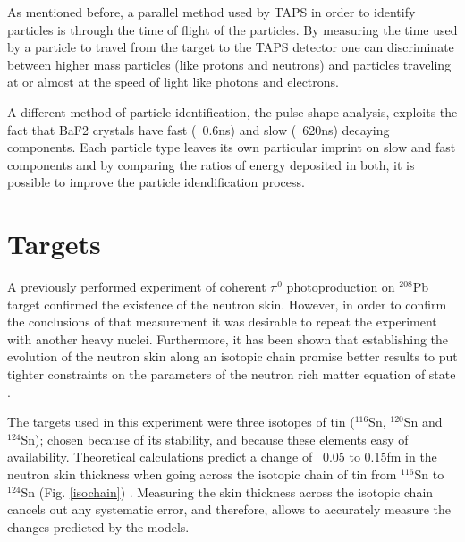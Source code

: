 \indent As mentioned before, a parallel method used by TAPS in order to identify particles is through the time of flight of the particles. By measuring  the  time used by a  particle to travel  from  the  target  to the TAPS detector one can discriminate between higher mass particles (like protons and neutrons) and particles traveling at or almost at the speed of light like photons and electrons.

\indent A different method of particle identification, the pulse shape analysis, exploits the fact  that  BaF2  crystals  have  fast  (~0.6ns)  and  slow  (~620ns)  decaying components. Each particle type leaves its own particular imprint on slow and fast components and by comparing the ratios of energy deposited in both, it is possible to improve the particle idendification process.

\section{Targets}

\indent A previously performed experiment of coherent $\pi^{0}$ photoproduction on $^{208}$Pb target confirmed the existence of the neutron skin. However, in order to confirm the conclusions of that measurement it was desirable to repeat the experiment with another  heavy  nuclei.  Furthermore,  it  has  been shown  that establishing the evolution of the neutron skin  along  an isotopic  chain  promise  better  results  to  put  tighter constraints on the parameters of the neutron rich matter equation of state \cite{centelles}.

\indent The targets used in this experiment were three isotopes of tin ($^{116}$Sn, $^{120}$Sn and $^{124}$Sn); chosen because of its stability, and because these elements easy of availability. Theoretical  calculations  predict  a change of  ~0.05  to  0.15fm  in  the neutron  skin thickness when going across the isotopic chain of tin from $^{116}$Sn to $^{124}$Sn (Fig. \ref{isochain}) \cite{liewen}. Measuring the skin thickness across the  isotopic  chain  cancels  out  any systematic error,  and  therefore,  allows  to accurately measure the changes predicted by the models.


